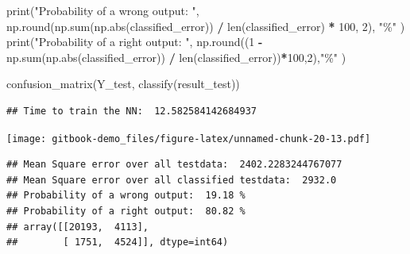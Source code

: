 \documentclass[
]{book}
\newenvironment{Shaded}{\begin{snugshade}}{\end{snugshade}}
\newcommand{\BuiltInTok}[1]{#1}
\newcommand{\DecValTok}[1]{\textcolor[rgb]{0.00,0.00,0.81}{#1}}
\newcommand{\NormalTok}[1]{#1}
\newcommand{\OperatorTok}[1]{\textcolor[rgb]{0.81,0.36,0.00}{\textbf{#1}}}
\newcommand{\StringTok}[1]{\textcolor[rgb]{0.31,0.60,0.02}{#1}}
\begin{document}
\begin{Shaded}
\begin{Highlighting}[]
\BuiltInTok{print}\NormalTok{(}\StringTok{"Probability of a wrong output: "}\NormalTok{, np.}\BuiltInTok{round}\NormalTok{(np.}\BuiltInTok{sum}\NormalTok{(np.}\BuiltInTok{abs}\NormalTok{(classified\_error)) }\OperatorTok{/} \BuiltInTok{len}\NormalTok{(classified\_error) }\OperatorTok{*} \DecValTok{100}\NormalTok{, }\DecValTok{2}\NormalTok{), }\StringTok{"\%"}\NormalTok{ )}
\BuiltInTok{print}\NormalTok{(}\StringTok{"Probability of a right output: "}\NormalTok{, np.}\BuiltInTok{round}\NormalTok{((}\DecValTok{1} \OperatorTok{{-}}\NormalTok{ np.}\BuiltInTok{sum}\NormalTok{(np.}\BuiltInTok{abs}\NormalTok{(classified\_error)) }\OperatorTok{/} \BuiltInTok{len}\NormalTok{(classified\_error))}\OperatorTok{*}\DecValTok{100}\NormalTok{,}\DecValTok{2}\NormalTok{),}\StringTok{"\%"}\NormalTok{ )}


\NormalTok{confusion\_matrix(Y\_test, classify(result\_test))}
\end{Highlighting}
\end{Shaded}

\begin{verbatim}
## Time to train the NN:  12.582584142684937
\end{verbatim}

\texttt{[image: gitbook-demo\_files/figure-latex/unnamed-chunk-20-13.pdf]}

\begin{verbatim}
## Mean Square error over all testdata:  2402.2283244767077
## Mean Square error over all classified testdata:  2932.0
## Probability of a wrong output:  19.18 %
## Probability of a right output:  80.82 %
## array([[20193,  4113],
##        [ 1751,  4524]], dtype=int64)
\end{verbatim}
\end{document}
